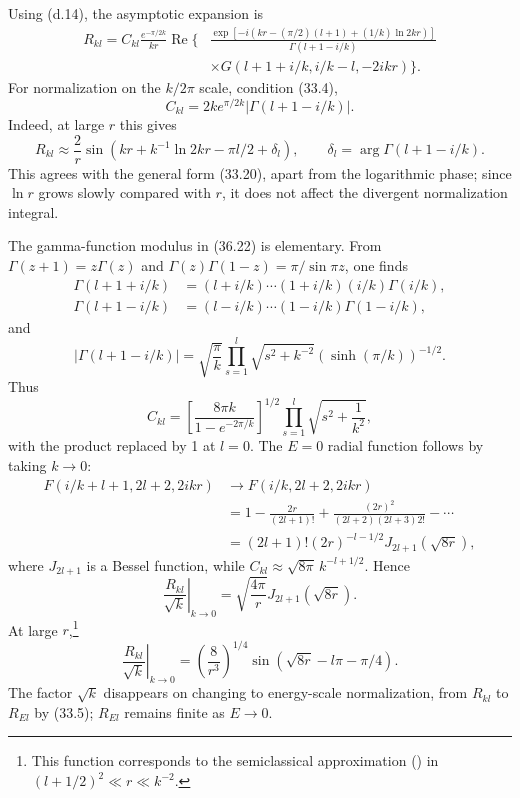 Using (d.14), the asymptotic expansion is
\begin{equation}
\begin{aligned}
R_{kl}=C_{kl}\frac{e^{-\pi/2k}}{kr}\operatorname{Re}\Biggl\{&
\frac{\exp[-i(kr-(\pi/2)(l+1)+(1/k)\ln2kr)]}{\Gamma(l+1-i/k)}\\[-2pt]
&\times G(l+1+i/k,i/k-l,-2ikr)\Biggr\}.
\end{aligned}\tag{36.21}
\end{equation}
For normalization on the $k/2\pi$ scale, condition (33.4),
\begin{equation}C_{kl}=2ke^{\pi/2k}|\Gamma(l+1-i/k)|.\tag{36.22}\end{equation}
Indeed, at large $r$ this gives
\begin{equation}
 R_{kl}\approx\frac2r\sin(kr+k^{-1}\ln2kr-\pi l/2+\delta_l),\qquad
 \delta_l=\arg\Gamma(l+1-i/k).\tag{36.23}
\end{equation}
This agrees with the general form (33.20), apart from the logarithmic phase;
since $\ln r$ grows slowly compared with $r$, it does not affect the divergent
normalization integral.

The gamma-function modulus in (36.22) is elementary. From
$\Gamma(z+1)=z\Gamma(z)$ and
$\Gamma(z)\Gamma(1-z)=\pi/\sin\pi z$, one finds
\[
\begin{aligned}
\Gamma(l+1+i/k)&=(l+i/k)\cdots(1+i/k)(i/k)\Gamma(i/k),\\
\Gamma(l+1-i/k)&=(l-i/k)\cdots(1-i/k)\Gamma(1-i/k),
\end{aligned}
\]
and
\[
|\Gamma(l+1-i/k)|=\sqrt{\frac\pi k}\prod_{s=1}^l\sqrt{s^2+k^{-2}}
(\sinh(\pi/k))^{-1/2}.
\]
Thus
\begin{equation}
 C_{kl}=\left[\frac{8\pi k}{1-e^{-2\pi/k}}\right]^{1/2}
 \prod_{s=1}^{l}\sqrt{s^2+\frac1{k^2}},\tag{36.24}
\end{equation}
with the product replaced by 1 at $l=0$.
The $E=0$ radial function follows by taking $k\to0$:
\[
\begin{aligned}
F(i/k+l+1,2l+2,2ikr)&\to F(i/k,2l+2,2ikr)\\
&=1-\frac{2r}{(2l+1)!}+\frac{(2r)^2}{(2l+2)(2l+3)2!}-\cdots\\
&=(2l+1)!(2r)^{-l-1/2}J_{2l+1}(\sqrt{8r}),
\end{aligned}
\]
where $J_{2l+1}$ is a Bessel function, while
$C_{kl}\approx\sqrt{8\pi}\,k^{-l+1/2}$. Hence
\begin{equation}
 \left.\frac{R_{kl}}{\sqrt k}\right|_{k\to0}
 =\sqrt{\frac{4\pi}{r}}J_{2l+1}(\sqrt{8r}).\tag{36.25}
\end{equation}
At large $r$,\footnote{This function corresponds to the semiclassical
approximation () in $(l+1/2)^2\ll r\ll k^{-2}$.}
\begin{equation}
 \left.\frac{R_{kl}}{\sqrt k}\right|_{k\to0}
 =\left(\frac8{r^3}\right)^{1/4}\sin(\sqrt{8r}-l\pi-\pi/4).\tag{36.26}
\end{equation}
The factor $\sqrt k$ disappears on changing to energy-scale normalization,
from $R_{kl}$ to $R_{El}$ by (33.5); $R_{El}$ remains finite as $E\to0$.

